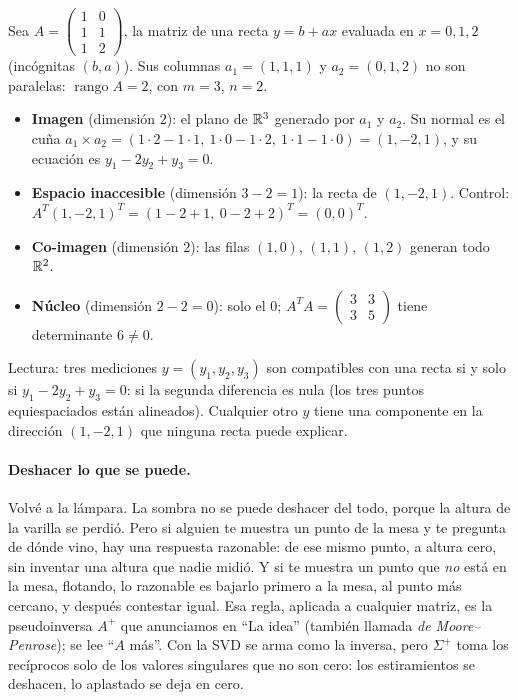 \begin{ejemplo}\label{ej:cuatro-subespacios}
Sea \(A=\begin{pmatrix}1&0\\1&1\\1&2\end{pmatrix}\), la matriz de una recta \(y=b+ax\)
evaluada en \(x=0,1,2\) (incógnitas \((b,a)\)). Sus columnas \(a_1=(1,1,1)\) y
\(a_2=(0,1,2)\) no son paralelas: \(\operatorname{rango}A=2\), con \(m=3\), \(n=2\).
\begin{itemize}
  \item \textbf{Imagen} (dimensión \(2\)): el plano de \(\mathbb{R}^3\) generado por \(a_1\) y
  \(a_2\). Su normal es el cuña
  \(a_1\times a_2=(1\cdot2-1\cdot1,\ 1\cdot0-1\cdot2,\ 1\cdot1-1\cdot0)=(1,-2,1)\), y su
  ecuación es \(y_1-2y_2+y_3=0\).
  \item \textbf{Espacio inaccesible} (dimensión \(3-2=1\)): la recta de \((1,-2,1)\).
  Control: \(A^T(1,-2,1)^T=(1-2+1,\ 0-2+2)^T=(0,0)^T\).
  \item \textbf{Co-imagen} (dimensión \(2\)): las filas \((1,0)\), \((1,1)\), \((1,2)\)
  generan todo \(\mathbb{R}^2\).
  \item \textbf{Núcleo} (dimensión \(2-2=0\)): solo el \(0\); \(A^TA=\begin{pmatrix}3&3\\3&5\end{pmatrix}\)
  tiene determinante \(6\neq0\).
\end{itemize}
Lectura: tres mediciones \(y=(y_1,y_2,y_3)\) son compatibles con una recta si y solo si
\(y_1-2y_2+y_3=0\): si la segunda diferencia es nula (los tres puntos
equiespaciados están alineados). Cualquier otro \(y\) tiene una componente en la dirección
\((1,-2,1)\) que ninguna recta puede explicar.
\end{ejemplo}

\paragraph{Deshacer lo que se puede.} Volvé a la lámpara. La sombra no se puede deshacer del
todo, porque la altura de la varilla se perdió. Pero si alguien te muestra un punto de la mesa
y te pregunta de dónde vino, hay una respuesta razonable: de ese mismo punto, a altura cero,
sin inventar una altura que nadie midió. Y si te muestra un punto que \emph{no} está en la
mesa, flotando, lo razonable es bajarlo primero a la mesa, al punto más cercano, y después
contestar igual. Esa regla, aplicada a cualquier matriz, es la pseudoinversa \(A^{+}\) que anunciamos en
\enquote{La idea} (también llamada \emph{de Moore--Penrose}); se lee \enquote{\(A\) más}. Con la SVD
se arma como la inversa, pero \(\Sigma^{+}\) toma los recíprocos solo de los valores
singulares que no son cero: los estiramientos se deshacen, lo aplastado se deja en cero.

